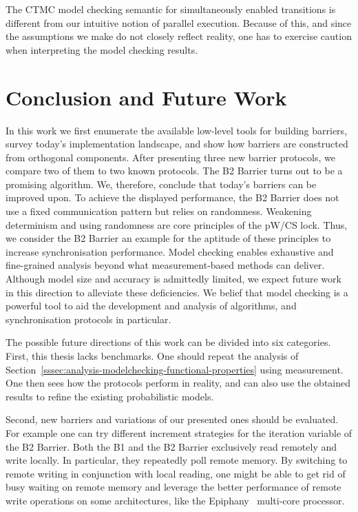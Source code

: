 \documentclass[a4paper, 10pt]{article}
\newcommand*\cleartooddpage{
	\clearpage
	\ifthenelse{\isodd{\thepage}}
		{}
		{\newpage \mbox{} \clearpage}
}
\begin{document}
The CTMC model checking semantic for simultaneously enabled transitions is different from our intuitive notion of parallel execution. Because of this, and since the assumptions we make do not closely reflect reality, one has to exercise caution when interpreting the model checking results.

\cleartooddpage
\section{Conclusion and Future Work}
\label{sec:conclusion}
In this work we first enumerate the available low-level tools for building barriers, survey today's implementation landscape, and show how barriers are constructed from orthogonal components.
After presenting three new barrier protocols, we compare two of them to two known protocols.
The B2 Barrier turns out to be a promising algorithm.
We, therefore, conclude that today's barriers can be improved upon. To achieve the displayed performance, the B2 Barrier does not use a fixed communication pattern but relies on randomness. Weakening determinism and using randomness are core principles of the pW/CS lock. Thus, we consider the B2 Barrier an example for the aptitude of these principles to increase synchronisation performance.
Model checking enables exhaustive and fine-grained analysis beyond what measurement-based methods can deliver.
Although model size and accuracy is admittedly limited, we expect future work in this direction to alleviate these deficiencies.
We belief that model checking is a powerful tool to aid the development and analysis of algorithms, and synchronisation protocols in particular.

The possible future directions of this work can be divided into six categories.
First, this thesis lacks benchmarks.
One should repeat the analysis of Section~\ref{sssec:analysis-modelchecking-functional-properties} using measurement. One then sees how the protocols perform in reality, and can also use the obtained results to refine the existing probabilistic models.

Second, new barriers and variations of our presented ones should be evaluated.
For example one can try different increment strategies for the iteration variable of the B2 Barrier.
Both the B1 and the B2 Barrier exclusively read remotely and write locally. In particular, they repeatedly poll remote memory.
By switching to remote writing in conjunction with local reading, one might be able to get rid of busy waiting on remote memory and leverage the better performance of remote write operations on some architectures, like the Epiphany~\cite{epiphany} multi-core processor.
\end{document}

